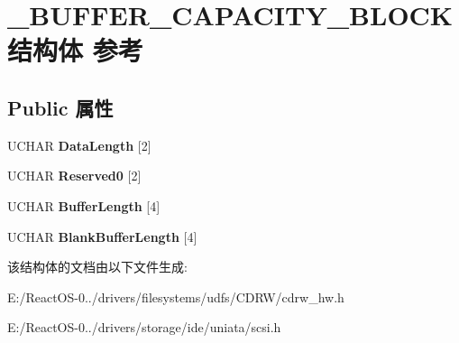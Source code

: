 \hypertarget{struct___b_u_f_f_e_r___c_a_p_a_c_i_t_y___b_l_o_c_k}{}\section{\+\_\+\+B\+U\+F\+F\+E\+R\+\_\+\+C\+A\+P\+A\+C\+I\+T\+Y\+\_\+\+B\+L\+O\+C\+K结构体 参考}
\label{struct___b_u_f_f_e_r___c_a_p_a_c_i_t_y___b_l_o_c_k}
\subsection*{Public 属性}
\begin{DoxyCompactItemize}
\item 
\mbox{\label{struct___b_u_f_f_e_r___c_a_p_a_c_i_t_y___b_l_o_c_k_a322fb9a3c86b83a6ac800964064d282f}} 
U\+C\+H\+AR {\bfseries Data\+Length} \mbox{[}2\mbox{]}
\item 
\mbox{\label{struct___b_u_f_f_e_r___c_a_p_a_c_i_t_y___b_l_o_c_k_a8fcfde6cde59f3cb25f1616f56d06232}} 
U\+C\+H\+AR {\bfseries Reserved0} \mbox{[}2\mbox{]}
\item 
\mbox{\label{struct___b_u_f_f_e_r___c_a_p_a_c_i_t_y___b_l_o_c_k_a0589a46f3a4415e7fb9a950ed213e791}} 
U\+C\+H\+AR {\bfseries Buffer\+Length} \mbox{[}4\mbox{]}
\item 
\mbox{\label{struct___b_u_f_f_e_r___c_a_p_a_c_i_t_y___b_l_o_c_k_a41f0a34d58c13c1271a8b88eff36b77e}} 
U\+C\+H\+AR {\bfseries Blank\+Buffer\+Length} \mbox{[}4\mbox{]}
\end{DoxyCompactItemize}


该结构体的文档由以下文件生成\+:\begin{DoxyCompactItemize}
\item 
E\+:/\+React\+O\+S-\/0../drivers/filesystems/udfs/\+C\+D\+R\+W/cdrw\+\_\+hw.\+h\item 
E\+:/\+React\+O\+S-\/0../drivers/storage/ide/uniata/scsi.\+h\end{DoxyCompactItemize}

